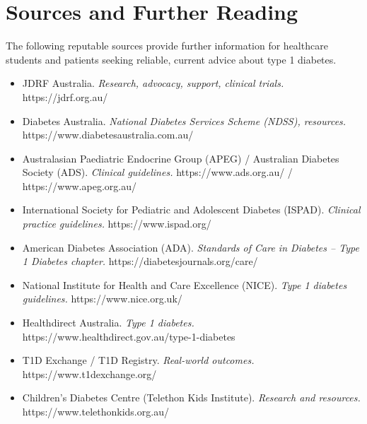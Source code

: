 \section*{Sources and Further Reading}
The following reputable sources provide further information for healthcare students and patients seeking reliable, current advice about type 1 diabetes.

\begin{itemize}
    \item JDRF Australia. \textit{Research, advocacy, support, clinical trials.} https://jdrf.org.au/
    \item Diabetes Australia. \textit{National Diabetes Services Scheme (NDSS), resources.} https://www.diabetesaustralia.com.au/
    \item Australasian Paediatric Endocrine Group (APEG) / Australian Diabetes Society (ADS). \textit{Clinical guidelines.} https://www.ads.org.au/ / https://www.apeg.org.au/
    \item International Society for Pediatric and Adolescent Diabetes (ISPAD). \textit{Clinical practice guidelines.} https://www.ispad.org/
    \item American Diabetes Association (ADA). \textit{Standards of Care in Diabetes -- Type 1 Diabetes chapter.} https://diabetesjournals.org/care/
    \item National Institute for Health and Care Excellence (NICE). \textit{Type 1 diabetes guidelines.} https://www.nice.org.uk/
    \item Healthdirect Australia. \textit{Type 1 diabetes.} https://www.healthdirect.gov.au/type-1-diabetes
    \item T1D Exchange / T1D Registry. \textit{Real-world outcomes.} https://www.t1dexchange.org/
    \item Children's Diabetes Centre (Telethon Kids Institute). \textit{Research and resources.} https://www.telethonkids.org.au/
\end{itemize}
